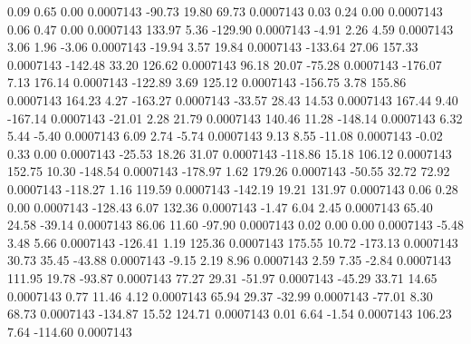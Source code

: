         0.09        0.65        0.00     0.0007143
      -90.73       19.80       69.73     0.0007143
        0.03        0.24        0.00     0.0007143
        0.06        0.47        0.00     0.0007143
      133.97        5.36     -129.90     0.0007143
       -4.91        2.26        4.59     0.0007143
        3.06        1.96       -3.06     0.0007143
      -19.94        3.57       19.84     0.0007143
     -133.64       27.06      157.33     0.0007143
     -142.48       33.20      126.62     0.0007143
       96.18       20.07      -75.28     0.0007143
     -176.07        7.13      176.14     0.0007143
     -122.89        3.69      125.12     0.0007143
     -156.75        3.78      155.86     0.0007143
      164.23        4.27     -163.27     0.0007143
      -33.57       28.43       14.53     0.0007143
      167.44        9.40     -167.14     0.0007143
      -21.01        2.28       21.79     0.0007143
      140.46       11.28     -148.14     0.0007143
        6.32        5.44       -5.40     0.0007143
        6.09        2.74       -5.74     0.0007143
        9.13        8.55      -11.08     0.0007143
       -0.02        0.33        0.00     0.0007143
      -25.53       18.26       31.07     0.0007143
     -118.86       15.18      106.12     0.0007143
      152.75       10.30     -148.54     0.0007143
     -178.97        1.62      179.26     0.0007143
      -50.55       32.72       72.92     0.0007143
     -118.27        1.16      119.59     0.0007143
     -142.19       19.21      131.97     0.0007143
        0.06        0.28        0.00     0.0007143
     -128.43        6.07      132.36     0.0007143
       -1.47        6.04        2.45     0.0007143
       65.40       24.58      -39.14     0.0007143
       86.06       11.60      -97.90     0.0007143
        0.02        0.00        0.00     0.0007143
       -5.48        3.48        5.66     0.0007143
     -126.41        1.19      125.36     0.0007143
      175.55       10.72     -173.13     0.0007143
       30.73       35.45      -43.88     0.0007143
       -9.15        2.19        8.96     0.0007143
        2.59        7.35       -2.84     0.0007143
      111.95       19.78      -93.87     0.0007143
       77.27       29.31      -51.97     0.0007143
      -45.29       33.71       14.65     0.0007143
        0.77       11.46        4.12     0.0007143
       65.94       29.37      -32.99     0.0007143
      -77.01        8.30       68.73     0.0007143
     -134.87       15.52      124.71     0.0007143
        0.01        6.64       -1.54     0.0007143
      106.23        7.64     -114.60     0.0007143
